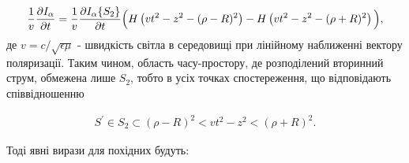 \begin{equation*} \begin{aligned}
\frac{1}{v} \frac{\partial I_\alpha}{\partial t} = 
\frac{1}{v} \frac{\partial  I_\alpha \{ S_{2} \} }{\partial t} 
\Big( H \left( vt^2 - z^2 - (\rho - R)^2 \right)  - 
H \left( vt^2 - z^2 - (\rho + R)^2 \right) \Big),
\end{aligned} \end{equation*}
%
де $ v = c/\sqrt{\epsilon \mu} $ - швидкість світла в середовищі при 
лінійному наближенні вектору поляризації. Таким чином, область часу-простору,
де розподілений вторинний струм, обмежена лише $ S_2 $, тобто в усіх точках 
спостереження, що відповідають співвідношенню

\begin{equation*} \begin{aligned}
S^\prime \in S_2 \subset (\rho-R)^2 < vt^2 - z^2 < (\rho+R)^2.
\end{aligned} \end{equation*}

Тоді явні вирази для похідних будуть:

